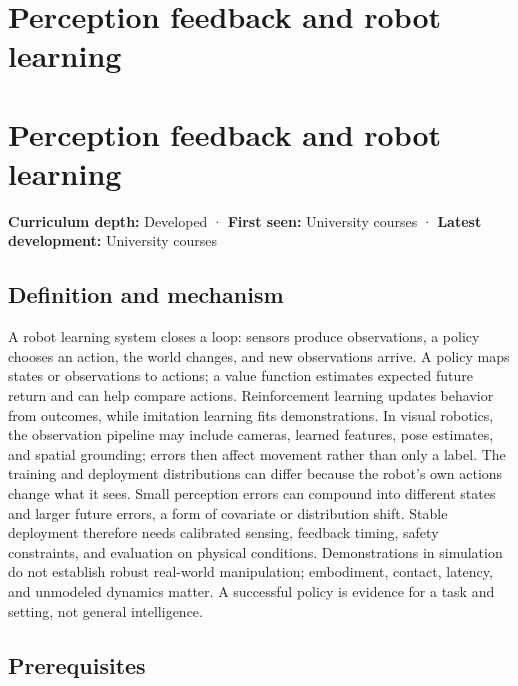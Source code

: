 \hypertarget{appendix-b0c42da325f1}{}
\section*{Perception feedback and robot learning}
\section{Perception feedback and robot learning}\label{perception-feedback-and-robot-learning}

\textbf{Curriculum depth:} Developed · \textbf{First seen:} University courses · \textbf{Latest development:} University courses

\subsection{Definition and mechanism}\label{definition-and-mechanism}

A robot learning system closes a loop: sensors produce observations, a policy chooses an action, the world changes, and new observations arrive. A policy maps states or observations to actions; a value function estimates expected future return and can help compare actions. Reinforcement learning updates behavior from outcomes, while imitation learning fits demonstrations. In visual robotics, the observation pipeline may include cameras, learned features, pose estimates, and spatial grounding; errors then affect movement rather than only a label. The training and deployment distributions can differ because the robot's own actions change what it sees. Small perception errors can compound into different states and larger future errors, a form of covariate or distribution shift. Stable deployment therefore needs calibrated sensing, feedback timing, safety constraints, and evaluation on physical conditions. Demonstrations in simulation do not establish robust real-world manipulation; embodiment, contact, latency, and unmodeled dynamics matter. A successful policy is evidence for a task and setting, not general intelligence.

\subsection{Prerequisites}\label{prerequisites}

